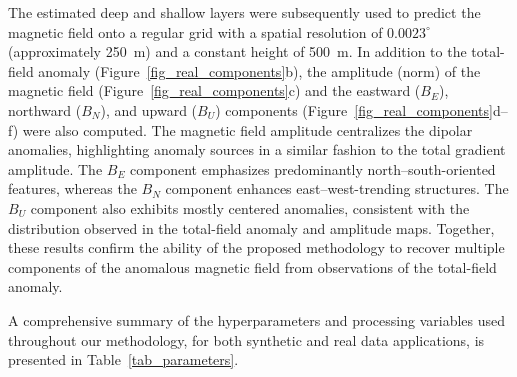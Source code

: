 The estimated deep and shallow layers were subsequently used to predict the
magnetic field onto a regular grid with a spatial resolution of
$0.0023^{\circ}$ (approximately 250~m) and a
constant height of 500~m. In addition to the total-field anomaly
(Figure~\ref{fig_real_components}b), the amplitude (norm) of the magnetic field
(Figure~\ref{fig_real_components}c) and the eastward ($B_E$),
northward ($B_N$), and upward ($B_U$) components
(Figure~\ref{fig_real_components}d--f) were also computed.
The magnetic field amplitude centralizes the dipolar anomalies,
highlighting anomaly sources in a similar fashion to the total gradient
amplitude.
The $B_E$ component
emphasizes predominantly north--south-oriented features, whereas the $B_N$
component enhances east--west-trending structures. The $B_U$ component also
exhibits mostly centered anomalies, consistent with the distribution observed
in the total-field anomaly and amplitude maps. Together, these results confirm the ability
of the proposed methodology to recover multiple components of the anomalous
magnetic field from observations of the total-field anomaly.

A comprehensive summary of the hyperparameters and processing variables
used throughout our methodology, for both synthetic and real data
applications, is presented in Table~\ref{tab_parameters}.

